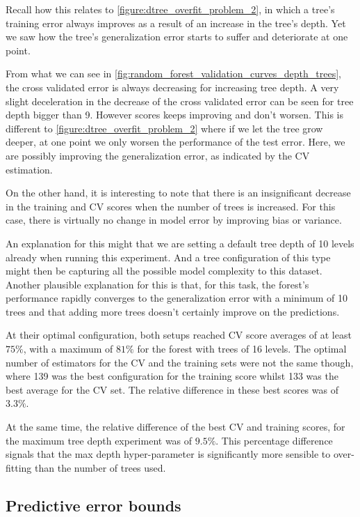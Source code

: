 Recall how this relates to \cref{figure:dtree_overfit_problem_2}, in which a tree's training error always improves as a result of an increase in the tree's depth.
Yet we saw how the tree's generalization error starts to suffer and deteriorate at one point.

From what we can see in \cref{fig:random_forest_validation_curves_depth_trees}, the cross validated error is always decreasing for increasing tree depth.
A very slight deceleration in the decrease of the cross validated error can be seen for tree depth bigger than 9.
However scores keeps improving and don't worsen.
This is different to \cref{figure:dtree_overfit_problem_2} where if we let the tree grow deeper, at one point we only worsen the performance of the test error.
Here, we are possibly improving the generalization error, as indicated by the CV estimation.

 On the other hand, it is interesting to note that there is an insignificant decrease in the training and CV scores when the number of trees is increased.
For this case, there is virtually no change in model error by improving bias or variance.

An explanation for this might that we are setting a default tree depth of 10 levels already when running this experiment.
And a tree configuration of this type might then be capturing all the possible model complexity to this dataset.
Another plausible explanation for this is that, for this task, the forest's performance rapidly converges to the generalization error with a minimum of 10 trees and that adding more trees doesn't certainly improve on the predictions.

At their optimal configuration, both setups reached CV score averages of at least $75\%$, with a maximum of $81\%$ for the forest
with trees of 16 levels.
The optimal number of estimators for the CV and the training sets were not the same though, where 139 was the best configuration for the training score whilst 133 was the best average for the CV set.
The relative difference in these best scores was of $3.3\%$.

At the same time, the relative difference of the best CV and training scores, for the maximum tree depth experiment was of $9.5\%$.
This percentage difference signals that the max depth hyper-parameter is significantly more sensible to over-fitting than the number of trees used.


\subsection{Predictive error bounds}\label{subsec:rforest_predictive_error_bounds}

